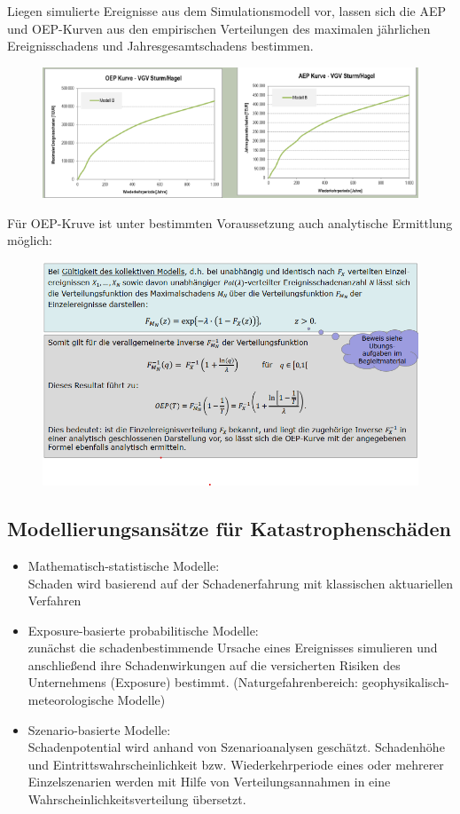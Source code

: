 \documentclass[12pt]{report}
\theoremstyle{dotless}
\theoremstyle{definition}
\begin{document}
Liegen simulierte Ereignisse aus dem Simulationsmodell vor, lassen sich die AEP und OEP-Kurven
aus den empirischen Verteilungen des maximalen jährlichen Ereignisschadens und
Jahresgesamtschadens bestimmen. 

\begin{figure}[ht]
	\centering
	\includegraphics[width= \textwidth]{Bilder/OEPAEP.png}
\end{figure}
 \vspace{4cm}
Für OEP-Kruve ist unter bestimmten Voraussetzung auch analytische Ermittlung möglich:
\begin{figure}[ht]
	\centering
	\includegraphics[width= \textwidth]{Bilder/Folie39.png}
\end{figure}

\subsection{Modellierungsansätze für Katastrophenschäden}

\begin{itemize}
\item Mathematisch-statistische Modelle: \\
Schaden wird basierend auf der Schadenerfahrung mit klassischen aktuariellen Verfahren
\item Exposure-basierte probabilitische Modelle: \\
zunächst die schadenbestimmende Ursache eines Ereignisses simulieren und anschließend ihre Schadenwirkungen auf die versicherten Risiken des Unternehmens (Exposure) bestimmt. (Naturgefahrenbereich: geophysikalisch-meteorologische Modelle)
\item Szenario-basierte Modelle: \\
Schadenpotential wird anhand von Szenarioanalysen geschätzt. Schadenhöhe und Eintrittswahrscheinlichkeit bzw. Wiederkehrperiode eines oder mehrerer Einzelszenarien werden mit Hilfe von Verteilungsannahmen in eine Wahrscheinlichkeitsverteilung übersetzt.
\end{itemize}
\end{document}
